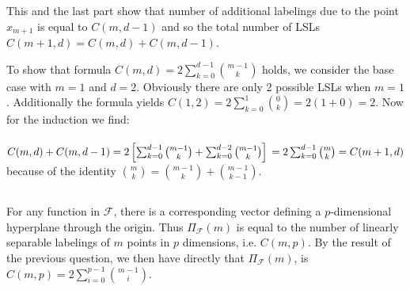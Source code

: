 \documentclass[]{article}
\begin{document}
This and the last part show that number of additional labelings due to the point $x_{m+1}$ is equal to $C(m, d-1)$ and so the total number of LSLs $C(m+1,d)=C(m,d)+C(m,d-1)$.

To show that formula $C(m,d) = 2\sum_{k=0}^{d-1}\binom{m-1}{k}$ holds, we consider the base case with $m=1$ and $d=2$. Obviously there are only 2 possible LSLs when $m=1$. Additionally the formula yields $C(1,2) = 2\sum_{k=0}^{1}\binom{0}{k}= 2(1 + 0) = 2$. Now for the induction we find:\\\\
$
C(m,d) + C(m, d-1) = 2\left[\sum_{k=0}^{d-1}\binom{m-1}{k}+\sum_{k=0}^{d-2}\binom{m-1}{k}\right]\\\\
=2\sum_{k=0}^{d-1}\binom{m}{k} = C(m+1,d)
$\\

\noindent because of the identity $\binom{m}{k} = \binom{m-1}{k} + \binom{m-1}{k-1}$.

\subsection{}
For any function in $\mathcal{F}$, there is a corresponding vector defining a $p$-dimensional hyperplane through the origin. Thus $\Pi_{\mathcal{F}}(m)$ is equal to the number of linearly separable labelings of $m$ points in $p$ dimensions, i.e. $C(m,p)$. By the result of the previous question, we then have directly that $\Pi_{\mathcal{F}}(m)$, is $C(m,p) = 2\sum_{i=0}^{p-1}\binom{m-1}{i}$.
\pagebreak

\section{}

\subsection{}

\begin{figure}[H]
\label{fig:plot}
\end{figure}
\end{document}
